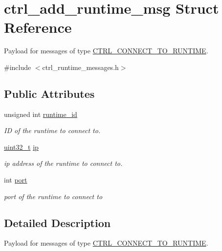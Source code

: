 \hypertarget{structctrl__add__runtime__msg}{\section{ctrl\-\_\-add\-\_\-runtime\-\_\-msg Struct Reference}
\label{structctrl__add__runtime__msg}
}


Payload for messages of type \hyperlink{ctrl__runtime__messages_8h_aff250b7918a6975b13277c84bc6ec5b9abd94df6087ab59f47dd546d51eb62d78}{C\-T\-R\-L\-\_\-\-C\-O\-N\-N\-E\-C\-T\-\_\-\-T\-O\-\_\-\-R\-U\-N\-T\-I\-M\-E}.  




{\ttfamily \#include $<$ctrl\-\_\-runtime\-\_\-messages.\-h$>$}

\subsection*{Public Attributes}
\begin{DoxyCompactItemize}
\item 
unsigned int \hyperlink{structctrl__add__runtime__msg_ad0b16bb9b47592729655a1f597694594}{runtime\-\_\-id}
\begin{DoxyCompactList}\small\item\em I\-D of the runtime to connect to. \end{DoxyCompactList}\item 
\hyperlink{msus_2webserver_2uthash_8h_a435d1572bf3f880d55459d9805097f62}{uint32\-\_\-t} \hyperlink{structctrl__add__runtime__msg_acc02f0403e49f0b92466de8703a2fc55}{ip}
\begin{DoxyCompactList}\small\item\em ip address of the runtime to connect to. \end{DoxyCompactList}\item 
int \hyperlink{structctrl__add__runtime__msg_a191816d657a91e53fb58ec1d73b2339e}{port}
\begin{DoxyCompactList}\small\item\em port of the runtime to connect to \end{DoxyCompactList}\end{DoxyCompactItemize}


\subsection{Detailed Description}
Payload for messages of type \hyperlink{ctrl__runtime__messages_8h_aff250b7918a6975b13277c84bc6ec5b9abd94df6087ab59f47dd546d51eb62d78}{C\-T\-R\-L\-\_\-\-C\-O\-N\-N\-E\-C\-T\-\_\-\-T\-O\-\_\-\-R\-U\-N\-T\-I\-M\-E}. 

